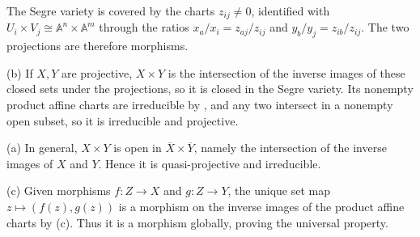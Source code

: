 The Segre variety is covered by the charts $z_{ij}\ne0$, identified with $U_i\times V_j\cong\mathbb A^n\times\mathbb A^m$ through the ratios $x_a/x_i=z_{aj}/z_{ij}$ and $y_b/y_j=z_{ib}/z_{ij}$. The two projections are therefore morphisms.

(b) If $X,Y$ are projective, $X\times Y$ is the intersection of the inverse images of these closed sets under the projections, so it is closed in the Segre variety. Its nonempty product affine charts are irreducible by , and any two intersect in a nonempty open subset, so it is irreducible and projective.

(a) In general, $X\times Y$ is open in $\overline X\times\overline Y$, namely the intersection of the inverse images of $X$ and $Y$. Hence it is quasi-projective and irreducible.

(c) Given morphisms $f:Z\to X$ and $g:Z\to Y$, the unique set map $z\mapsto(f(z),g(z))$ is a morphism on the inverse images of the product affine charts by (c). Thus it is a morphism globally, proving the universal property.
